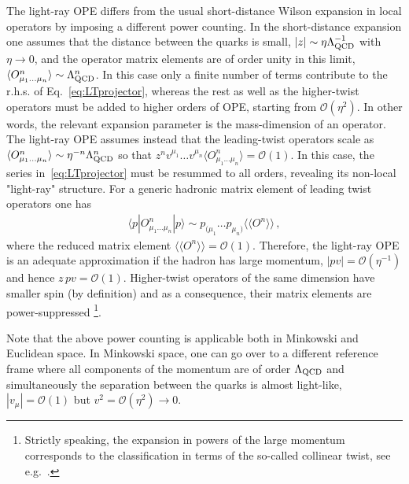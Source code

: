 The light-ray OPE differs from the usual short-distance Wilson  expansion in local operators by imposing a different power counting. In the short-distance expansion one assumes that the distance between the quarks is small, $|z| \sim \eta \Lambda^{-1}_{\rm QCD}$ with $\eta\to 0$, and the operator matrix elements are of order unity in this limit, $\langle O_{\mu_1\ldots\mu_n}^{n} \rangle \sim \Lambda^{n}_{\rm QCD}$. In this case only a finite number of terms contribute to the r.h.s. of Eq.~\eqref{eq:LTprojector}, whereas the rest as well as the higher-twist operators must be added to 
higher orders of OPE, starting  from $\mathcal{O}(\eta^2)$. In other words, the relevant expansion parameter is the mass-dimension of an operator. 
The light-ray OPE assumes instead that the leading-twist operators scale as $\langle O_{\mu_1\ldots\mu_n}^{n} \rangle \sim \eta^{-n} \Lambda^{n}_{\rm QCD}$ so that $ z^n v^{\mu_1}\ldots v^{\mu_n} \langle O_{\mu_1\ldots\mu_n}^{n} \rangle  = \mathcal{O}(1)$. In this case, the series in~\eqref{eq:LTprojector} must be resummed to all orders, revealing its non-local "light-ray" structure. For a generic hadronic matrix element of leading twist operators one has
\begin{align}
 \langle p | O_{\mu_1\ldots\mu_n}^{n} |p\rangle \sim p_{(\mu_1}\ldots p_{\mu_n)} \langle\!\langle O^{n} \rangle\!\rangle\,, 
\end{align}      
where the reduced matrix element $\langle\!\langle O^{n} \rangle\!\rangle = \mathcal{O}(1)$. Therefore, the light-ray OPE is an adequate approximation if the hadron has large momentum, $|pv| = \mathcal{O}(\eta^{-1})$ and hence $ z\,pv =  \mathcal{O}(1)$. Higher-twist operators of the same dimension have smaller spin (by definition) and as a consequence, their matrix elements are power-suppressed \footnote{Strictly speaking, the expansion in powers of the large momentum corresponds to the classification in terms of the so-called collinear twist, see e.g.~\cite{Geyer:1999uq,Geyer:2000ig}.}.  

Note that the above power counting is applicable both in Minkowski and Euclidean space. In Minkowski space, one can 
go over to a different reference frame where all components of the momentum are of order $\Lambda_{\rm QCD}$ 
and simultaneously the separation between the quarks is almost light-like, $|v_\mu| = \mathcal{O}(1)$ but 
$v^2 = \mathcal{O}(\eta^2) \to 0$. 

